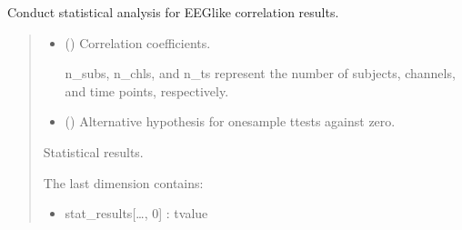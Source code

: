 \documentclass[letterpaper,10pt,english]{sphinxhowto}
\begin{document}
\begin{fulllineitems}
\label{\detokenize{stats_cal:neurora.stats_cal.stats}}
\pysigstartsignatures
{}
\pysigstopsignatures
\sphinxAtStartPar
Conduct statistical analysis for EEG\sphinxhyphen{}like correlation results.
\begin{quote}\begin{description}
\begin{itemize}
\item {} 
\sphinxAtStartPar
{} (\sphinxstyleliteralemphasis{\sphinxupquote{, }}\sphinxstyleliteralemphasis{\sphinxupquote{ {[}}}\sphinxstyleliteralemphasis{\sphinxupquote{, }}\sphinxstyleliteralemphasis{\sphinxupquote{, }}\sphinxstyleliteralemphasis{\sphinxupquote{{]}}}) \textendash{} 
\sphinxAtStartPar
Correlation coefficients.

\sphinxAtStartPar
n\_subs, n\_chls, and n\_ts represent the number of subjects, channels,
and time points, respectively.


\item {} 
\sphinxAtStartPar
{} (\sphinxstyleliteralemphasis{\sphinxupquote{, }}\sphinxstyleliteralemphasis{\sphinxupquote{, }}\sphinxstyleliteralemphasis{\sphinxupquote{, }}) \textendash{} Alternative hypothesis for one\sphinxhyphen{}sample t\sphinxhyphen{}tests against zero.

\end{itemize}

\sphinxAtStartPar

\sphinxAtStartPar
{} \textendash{} Statistical results.

\sphinxAtStartPar
The last dimension contains:
\begin{itemize}
\item {} 
\sphinxAtStartPar
stat\_results{[}…, 0{]} : t\sphinxhyphen{}value


\end{itemize}
\end{description}
\end{quote}
\end{fulllineitems}
\end{document}
